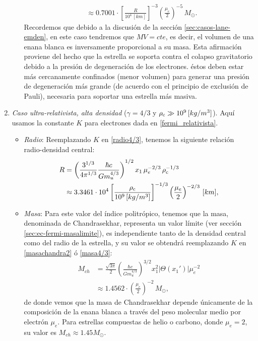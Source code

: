 \begin{enumerate}
\begin{itemize}
\begin{align}
&\approx0.7001\cdot\left[\frac{R}{10^{4}\,[km]}\right]^{-3}\left(\frac{\mu_e}{2}\right)^{-5}\,M_{\odot}.
\end{align}
Recordemos que debido a la discusión de la sección \eqref{sec:casos-lane-emden}, en este caso tendremos que $MV=cte$, es decir, el volumen de una enana blanca es inversamente proporcional a su masa. Esta afirmación proviene del hecho que la estrella se soporta contra el colapso gravitatorio debido a la presión de degeneración de los electrones. éstos deben estar más cercanamente confinados (menor volumen) para generar una presión de degeneración más grande (de acuerdo con el principio de exclusión de Pauli), necesaria para soportar una estrella más masiva.
\end{itemize}

 \item \emph{Caso ultra-relativista, alta densidad} ($\gamma=4/3$ y $\rho_{\rm c}\gg10^{9}\,[kg/m^3]$). Aquí usamos la constante $K$ para electrones dada en \eqref{fermi_relativista}.
\begin{itemize}
 \item \emph{Radio}: Reemplazando $K$ en \eqref{radio4/3}, tenemos la siguiente relación radio-densidad central:
\begin{align}
R&=\left(\frac{3^{1/3}}{4\pi^{1/3}}\frac{\hbar c}{Gm_u^{4/3}}\right)^{1/2}x_1\,\mu_e^{-2/3}\,\rho_{\rm c}^{-1/3}\\
 &\approx3.3461\cdot10^{4}\left[\frac{\rho_{\rm c}}{10^{9}\,[kg/m^3]}\right]^{-1/3}\left(\frac{\mu_e}{2}\right)^{-2/3}\,[km],
\end{align}
\item \emph{Masa}: Para este valor del índice politrópico, tenemos que la masa, denominada de Chandrasekhar, representa un valor límite (ver sección \eqref{sec:ec-fermi-masalimite}), es independiente tanto de la densidad central como del radio de la estrella, y su valor se obtendrá reemplazando $K$ en \eqref{masachandra2} ó \eqref{masa4/3}:
\begin{align}\label{masachandra}
M_{ch}&=\frac{\sqrt{3\pi}}{2}\left(\frac{\hbar c}{Gm_u^{4/3}}\right)^{3/2}x_1^2\left|\Theta(x_1')\right|\mu_e^{-2}\\
 &\approx1.4562\cdot\left(\frac{\mu_e}{2}\right)^{-2}\,M_{\odot},\label{enanablanca4/3-masa}
\end{align}
de donde vemos que la masa de Chandrasekhar depende únicamente de la composición de la enana blanca a través del peso molecular medio por electrón $\mu_e$. Para estrellas compuestas de helio o carbono, donde $\mu_e=2$, su valor es $M_{ch}\approx1.45M_{\odot}$.
\end{itemize}


\end{enumerate}
